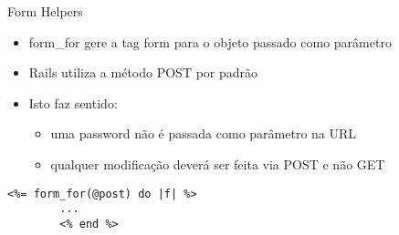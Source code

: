 \begin{frame}{Form Helpers}
	\begin{itemize}
		\item \alert{form\_for} gere a tag form para o objeto passado como parâmetro
		\item Rails utiliza a método \alert{POST} por padrão
		\item Isto faz sentido:
		\begin{itemize}
			\item uma password não é passada como parâmetro na URL
			\item qualquer modificação deverá ser feita via POST e não GET
		\end{itemize}
	\end{itemize}	
	\begin{lstlisting}[style=RubyInputStyle, caption=views/posts/\_form.html.erb]
		<%= form_for(@post) do |f| %>
		...
		<% end %>		
	\end{lstlisting}
\end{frame}

